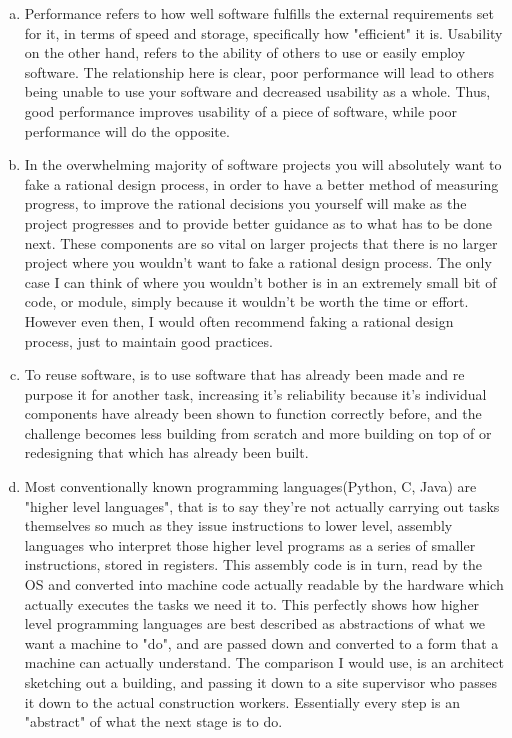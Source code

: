 \documentclass[12pt]{article}
\begin{document}
\begin{enumerate}[(a)]
\item Performance refers to how well software fulfills the external requirements set for it, in terms of speed and storage, specifically how "efficient" it is. Usability on the other hand, refers to the ability of others to use or easily employ software. The relationship here is clear, poor performance will lead to others being unable to use your software and decreased usability as a whole. Thus, good performance improves usability of a piece of software, while poor performance will do the opposite.
\item In the overwhelming majority of software projects you will absolutely want to fake a rational design process, in order to have a better method of measuring progress, to improve the rational decisions you yourself will make as the project progresses and to provide better guidance as to what has to be done next. These components are so vital on larger projects that there is no larger project where you wouldn't want to fake a rational design process. The only case I can think of where you wouldn't bother is in an extremely small bit of code, or module, simply because it wouldn't be worth the time or effort. However even then, I would often recommend faking a rational design process, just to maintain good practices.
\item To reuse software, is to use software that has already been made and re purpose it for another task, increasing it's reliability because it's individual components have already been shown to function correctly before, and the challenge becomes less building from scratch and more building on top of or redesigning that which has already been built.
\item Most conventionally known programming languages(Python, C, Java) are "higher level languages", that is to say they're not actually carrying out tasks themselves so much as they issue instructions to lower level, assembly languages who interpret those higher level programs as a series of smaller instructions, stored in registers. This assembly code is in turn, read by the OS and converted into machine code actually readable by the hardware which actually executes the tasks we need it to. This perfectly shows how higher level programming languages are best described as abstractions of what we want a machine to "do", and are passed down and converted to a form that a machine can actually understand. The comparison I would use, is an architect sketching out a building, and passing it down to a site supervisor who passes it down to the actual construction workers. Essentially every step is an "abstract" of what the next stage is to do.
\end{enumerate}
\newpage
\lstset{language=Python, basicstyle=\tiny, breaklines=true, showspaces=false,
  showstringspaces=false, breakatwhitespace=true}
\def\thesection{\Alph{section}}
\end{document}
